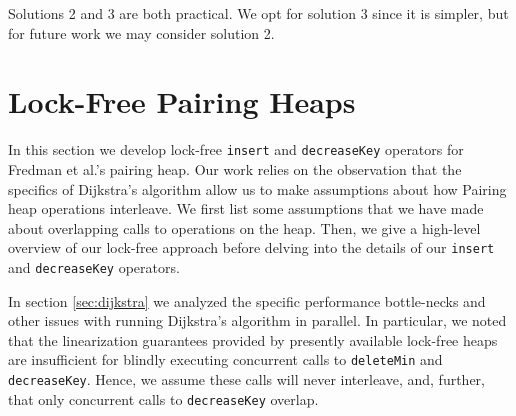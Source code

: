 \documentclass{acm_proc_article-sp}
\begin{document}
Solutions 2 and 3 are both practical. We opt for solution 3 since it is simpler, but
for future work we may consider solution 2.

\section{Lock-Free Pairing Heaps}
In this section we develop lock-free \texttt{insert} and \texttt{decreaseKey}
operators for Fredman et al.'s pairing heap. Our
work relies on the observation that
the specifics of
Dijkstra's algorithm allow us to make assumptions about how
Pairing heap operations interleave. 
We first list some assumptions that we have made about overlapping
calls to operations on the heap. Then, we give a high-level overview
of our lock-free approach before delving into the details of our
\texttt{insert} and \texttt{decreaseKey} operators.

In section \ref{sec:dijkstra} we analyzed the specific performance bottle-necks and other
issues with running Dijkstra's algorithm in parallel. In particular, we noted that the
linearization guarantees provided by presently available lock-free heaps are insufficient for
blindly executing
concurrent calls to \texttt{deleteMin} and \texttt{decreaseKey}. Hence, we assume
these calls will never interleave, and, further, that only concurrent calls to 
\texttt{decreaseKey} overlap.

\end{document}
